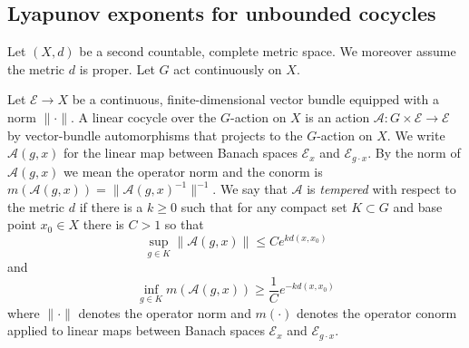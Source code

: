 \documentclass[10pt,reqno]{amsart}
\theoremstyle{Theorem}
\theoremstyle{definition}
\theoremstyle{remark}
\newcommand{\R}{\mathbb {R}}
\newcommand{\Gl}{\mathrm{GL}}
\def\calA{\mathcal A}
\def\calE{\mathcal E}
\begin{document}
\def \top{\mathrm{top}}





\subsection{Lyapunov exponents for unbounded cocycles}
\label{subsection:Lyap}
\def\calE{\mathcal E}
Let $(X,d)$ be a second countable, complete metric space.  We moreover   assume the metric $d$ is proper.  Let $G$ act continuously  on $X$.

Let $\calE\to X$ be a continuous,  finite-dimensional  vector bundle  equipped with a norm  $\|\cdot\|$.  A linear cocycle over the $G$-action on $X$ is an action $\calA\colon G\times \calE\to \calE$ by vector-bundle automorphisms that projects to the $G$-action on $X$.
We write $\calA(g,x)$ for the linear map between Banach spaces $\calE_x$ and $\calE_{g\cdot x}$.  By the norm of $\calA(g,x)$ we mean the operator norm and the conorm is $m(\calA(g,x))= \|\calA(g,x)^{-1}\|^{-1}$.
We say that $\calA$ is \emph{tempered} with respect to the metric $d$ if there is a $k\ge0$ such that  for any compact set $K\subset G$ and base point $x_0\in X$ there is $C>1$ so that $$\sup_{g\in K} \|\calA(g,x)\| \le Ce^{k d(x,x_0)}$$ and
 $$\inf_{g\in K} m(\calA(g,x)) \ge \frac{1}{C}e^{-k d(x,x_0)}$$
 where $\|\cdot\|$ denotes the operator norm and $m(\cdot)$ denotes the operator conorm applied to  linear maps between Banach spaces $\calE_x$ and $\calE_{g\cdot x}$.  %
\end{document}
